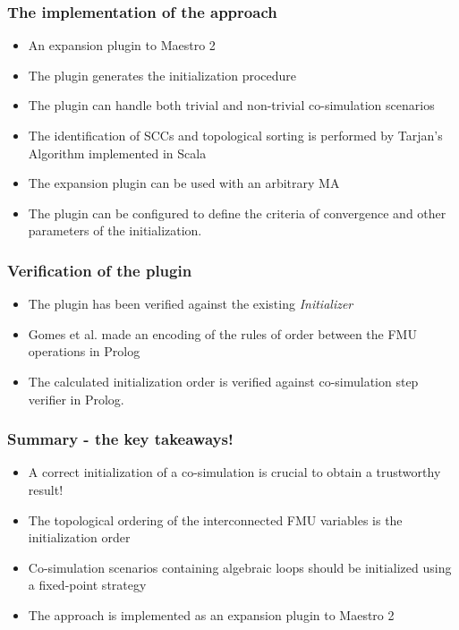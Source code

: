 \documentclass{beamer}
\begin{document}
\begin{frame}
\frametitle{The implementation of the approach}
\begin{itemize}
    \item An expansion plugin to Maestro 2
    \item The plugin generates the initialization procedure
    \item The plugin can handle both trivial and non-trivial co-simulation scenarios
    \item The identification of SCCs and topological sorting is performed by Tarjan's Algorithm implemented in Scala
    \item The expansion plugin can be used with an arbitrary MA
    \item The plugin can be configured to define the criteria of convergence and other parameters of the initialization.
\end{itemize}
\end{frame}



\begin{frame}
\frametitle{Verification of the plugin}
\begin{itemize}
    \item The plugin has been verified against the existing \textit{Initializer}
    \item Gomes et al. made an encoding of the rules of order between the FMU operations in Prolog
    \item The calculated initialization order is verified against co-simulation step verifier in Prolog.
\end{itemize}
\end{frame}


\begin{frame}
\frametitle{Summary - the key takeaways!}
\begin{itemize}
    \item A correct initialization of a co-simulation is crucial to obtain a trustworthy result!
    \item The topological ordering of the interconnected FMU variables is the initialization order
    \item Co-simulation scenarios containing algebraic loops should be initialized using a fixed-point strategy
    \item The approach is implemented as an expansion plugin to Maestro 2  
\end{itemize}
\end{frame}
\end{document}
